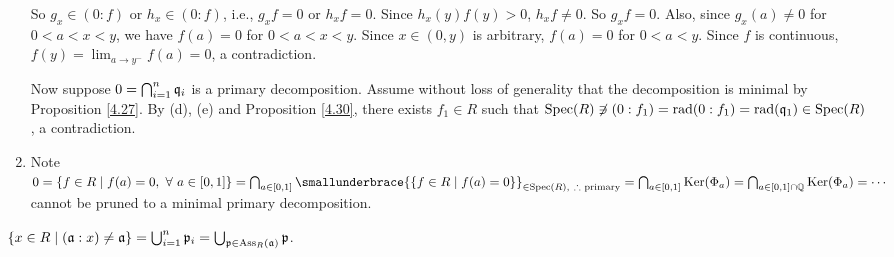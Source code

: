 \begin{example}
\begin{enumerate}
\begin{center}
            \end{center}
            So $g_x \in (0:f)$ or $h_x \in (0:f)$, i.e., $g_xf = 0$ or $h_xf =  0$. Since $h_x(y)f(y) > 0$, $h_xf \neq 0$. So $g_xf = 0$. Also, since $g_x(a) \neq 0$ for $0 < a < x < y$, we have $f(a) = 0$ for $0 < a < x < y$. Since $x \in (0,y)$ is arbitrary, $f(a) = 0$ for $0 < a < y$. Since $f$ is continuous, $f(y) = \lim_{a \to y^{-}}f(a) = 0$, a contradiction. \par 
            Now suppose $0 = \bigcap_{i=1}^{n}\mathfrak{q}_i$ is a primary decomposition. Assume without loss of generality that the decomposition is minimal by Proposition \ref{4.27}. By (d), (e) and Proposition \ref{4.30}, there exists $f_1 \in R$ such that $\operatorname{Spec}(R) \not \ni (0:f_1) = \operatorname{rad}(0:f_1) = \operatorname{rad}(\mathfrak{q}_1) \in \operatorname{Spec}(R)$, a contradiction. 
        \item Note $0 = \{f \in R \mid f(a) = 0, \fa a \in [0,1]\} = \bigcap_{a \in [0,1]} \smallunderbrace{\{f \in R \mid f(a) = 0\}}_{\in \operatorname{Spec}(R),\ \therefore \text{ primary}} = \bigcap_{a \in [0,1]} \ker(\Phi_a) = \bigcap_{a \in [0,1] \cap \bbQ} \ker(\Phi_a) = \cdots$ cannot be pruned to a minimal primary decomposition.
    \end{enumerate}
\end{example}

\begin{proposition}\label{4.33}
    $\{x \in R \mid (\mathfrak{a}:x) \neq \mathfrak{a}\} = \bigcup_{i=1}^{n} \mathfrak{p}_i = \bigcup_{\mathfrak{p} \in \operatorname{Ass}_R(\mathfrak{a})} \mathfrak{p}$.
\end{proposition}

